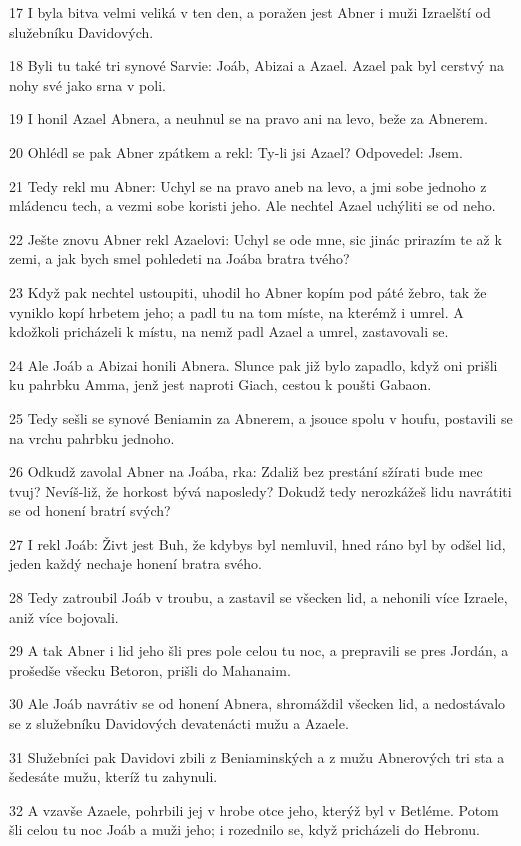 \par 17 I byla bitva velmi veliká v ten den, a poražen jest Abner i muži Izraelští od služebníku Davidových.
\par 18 Byli tu také tri synové Sarvie: Joáb, Abizai a Azael. Azael pak byl cerstvý na nohy své jako srna v poli.
\par 19 I honil Azael Abnera, a neuhnul se na pravo ani na levo, beže za Abnerem.
\par 20 Ohlédl se pak Abner zpátkem a rekl: Ty-li jsi Azael? Odpovedel: Jsem.
\par 21 Tedy rekl mu Abner: Uchyl se na pravo aneb na levo, a jmi sobe jednoho z mládencu tech, a vezmi sobe koristi jeho. Ale nechtel Azael uchýliti se od neho.
\par 22 Ješte znovu Abner rekl Azaelovi: Uchyl se ode mne, sic jinác prirazím te až k zemi, a jak bych smel pohledeti na Joába bratra tvého?
\par 23 Když pak nechtel ustoupiti, uhodil ho Abner kopím pod páté žebro, tak že vyniklo kopí hrbetem jeho; a padl tu na tom míste, na kterémž i umrel. A kdožkoli pricházeli k místu, na nemž padl Azael a umrel, zastavovali se.
\par 24 Ale Joáb a Abizai honili Abnera. Slunce pak již bylo zapadlo, když oni prišli ku pahrbku Amma, jenž jest naproti Giach, cestou k poušti Gabaon.
\par 25 Tedy sešli se synové Beniamin za Abnerem, a jsouce spolu v houfu, postavili se na vrchu pahrbku jednoho.
\par 26 Odkudž zavolal Abner na Joába, rka: Zdaliž bez prestání sžírati bude mec tvuj? Nevíš-liž, že horkost bývá naposledy? Dokudž tedy nerozkážeš lidu navrátiti se od honení bratrí svých?
\par 27 I rekl Joáb: Živt jest Buh, že kdybys byl nemluvil, hned ráno byl by odšel lid, jeden každý nechaje honení bratra svého.
\par 28 Tedy zatroubil Joáb v troubu, a zastavil se všecken lid, a nehonili více Izraele, aniž více bojovali.
\par 29 A tak Abner i lid jeho šli pres pole celou tu noc, a prepravili se pres Jordán, a prošedše všecku Betoron, prišli do Mahanaim.
\par 30 Ale Joáb navrátiv se od honení Abnera, shromáždil všecken lid, a nedostávalo se z služebníku Davidových devatenácti mužu a Azaele.
\par 31 Služebníci pak Davidovi zbili z Beniaminských a z mužu Abnerových tri sta a šedesáte mužu, kteríž tu zahynuli.
\par 32 A vzavše Azaele, pohrbili jej v hrobe otce jeho, kterýž byl v Betléme. Potom šli celou tu noc Joáb a muži jeho; i rozednilo se, když pricházeli do Hebronu.

